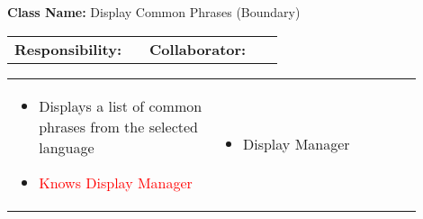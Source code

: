 \begin{cards}[]
    \textbf{Class Name:} Display Common Phrases (Boundary)
    \tcbline
    \begin{tabular}{p{0.45\linewidth} | p{0.45\linewidth}}
        \textbf{Responsibility:}& 
        \textbf{Collaborator:}\\
    \end{tabular}
    \tcbline
    \begin{tabular}{p{0.45\linewidth} | p{0.45\linewidth}}
        \begin{itemize}
            \item Displays a list of common phrases from the selected language
            \item \textcolor{red}{Knows Display Manager}
        \end{itemize}
        &
        \begin{itemize}
            \item Display Manager
        \end{itemize}
    \end{tabular}
\end{cards}